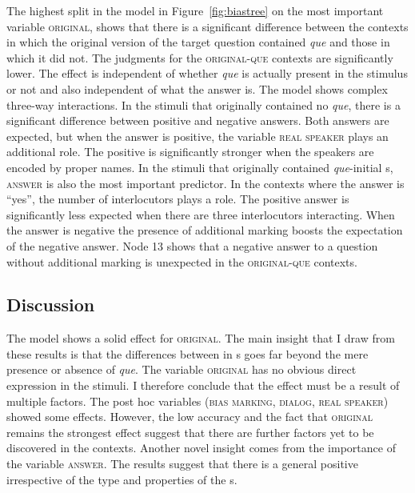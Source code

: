 The highest split in the model in Figure~\ref{fig:biastree} on the most important variable \textsc{original}, shows that there is a significant difference between the contexts in which the original version of the target question contained  \emph{que}  and those in which it  did not.   The judgments for the \textsc{original-que} contexts are significantly lower. The effect  is independent of whether \emph{que}  is actually present in the stimulus or not and also independent of what the answer is. 
The model shows complex three-way interactions. In the stimuli that  originally contained no \emph{que}, there is a significant difference between positive and negative answers. Both answers are expected, but when the answer is positive, the variable \textsc{real speaker} plays an additional role. The positive  is significantly stronger when the speakers are encoded by proper names.  In the stimuli that originally  contained \emph{que}-initial s, \textsc{answer} is also the most important predictor. In the contexts where the answer is ``yes'', the number of interlocutors plays a role. The positive answer is significantly less expected when there are three interlocutors interacting. When the answer is negative the presence of additional  marking boosts the expectation of the negative answer. Node 13 shows that a negative answer to a question without additional  marking is unexpected in the \textsc{original-que} contexts.

\subsection{Discussion}
The model shows a solid effect for \textsc{original}. The main insight that I draw from these  results is that  the differences between  in  s goes far beyond the mere presence or absence of \emph{que}.  The variable \textsc{original} has no obvious direct expression in the stimuli. I therefore conclude that the effect must be a result of multiple factors.  The post hoc variables (\textsc{bias marking}, \textsc{dialog}, \textsc{real speaker}) showed some  effects. However, the low accuracy and the fact that \textsc{original} remains the strongest effect suggest  that there are further factors yet to be discovered in the contexts.
Another novel insight comes from the importance of the variable \textsc{answer}. The results suggest that there is a general positive  irrespective of the type and properties of the s.

